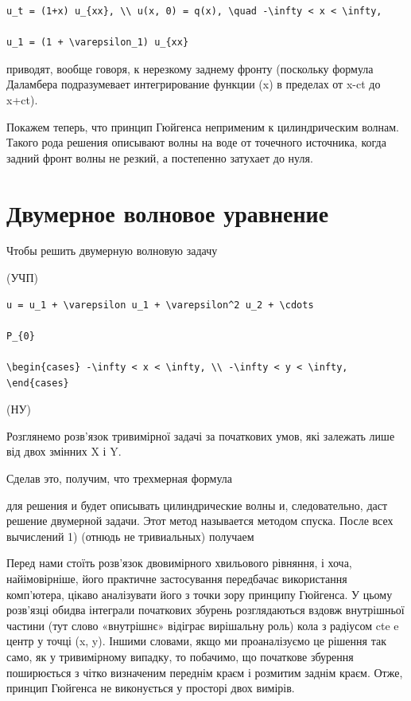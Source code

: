 \documentclass[
  ukrainian,
]{article}
\begin{document}
\begin{verbatim}
u_t = (1+x) u_{xx}, \\ u(x, 0) = q(x), \quad -\infty < x < \infty,

u_1 = (1 + \varepsilon_1) u_{xx}
\end{verbatim}

приводят, вообще говоря, к нерезкому заднему фронту (поскольку формула
Даламбера подразумевает интегрирование функции \psi(x) в пределах от
x-ct до x+ct).

Покажем теперь, что принцип Гюйгенса неприменим к цилиндрическим волнам.
Такого рода решения описывают волны на воде от точечного источника,
когда задний фронт волны не резкий, а постепенно затухает до нуля.

\section{Двумерное волновое
уравнение}\label{ux434ux432ux443ux43cux435ux440ux43dux43eux435-ux432ux43eux43bux43dux43eux432ux43eux435-ux443ux440ux430ux432ux43dux435ux43dux438ux435}

Чтобы решить двумерную волновую задачу

(УЧП)

\begin{verbatim}
u = u_1 + \varepsilon u_1 + \varepsilon^2 u_2 + \cdots

P_{0}

\begin{cases} -\infty < x < \infty, \\ -\infty < y < \infty, \end{cases}
\end{verbatim}

(НУ)

Розглянемо розв'язок тривимірної задачі за початкових умов, які залежать
лише від двох змінних X і Y.

Сделав это, получим, что трехмерная формула

для решения и будет описывать цилиндрические волны и, следовательно,
даст решение двумерной задачи. Этот метод называется методом спуска.
После всех вычислений 1) (отнюдь не тривиальных) получаем

Перед нами стоїть розв'язок двовимірного хвильового рівняння, і хоча,
найімовірніше, його практичне застосування передбачає використання
комп'ютера, цікаво аналізувати його з точки зору принципу Гюйгенса. У
цьому розв'язці обидва інтеграли початкових збурень розглядаються вздовж
внутрішньої частини (тут слово «внутрішнє» відіграє вирішальну роль)
кола з радіусом cte e центр у точці (x, y). Іншими словами, якщо ми
проаналізуємо це рішення так само, як у тривимірному випадку, то
побачимо, що початкове збурення поширюється з чітко визначеним переднім
краєм і розмитим заднім краєм. Отже, принцип Гюйгенса не виконується у
просторі двох вимірів.
\end{document}
